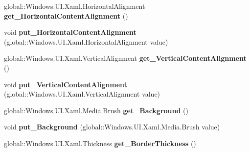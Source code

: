 \begin{DoxyCompactItemize}
global\+::\+Windows.\+U\+I.\+Xaml.\+Horizontal\+Alignment {\bfseries get\+\_\+\+Horizontal\+Content\+Alignment} ()
\item 
\mbox{\label{interface_windows_1_1_u_i_1_1_xaml_1_1_controls_1_1_i_control_aa4cc459384bbe6c700e3a0f0b23f633e}} 
void {\bfseries put\+\_\+\+Horizontal\+Content\+Alignment} (global\+::\+Windows.\+U\+I.\+Xaml.\+Horizontal\+Alignment value)
\item 
\mbox{\label{interface_windows_1_1_u_i_1_1_xaml_1_1_controls_1_1_i_control_ae586ce721d361940da51fcefd32816c7}} 
global\+::\+Windows.\+U\+I.\+Xaml.\+Vertical\+Alignment {\bfseries get\+\_\+\+Vertical\+Content\+Alignment} ()
\item 
\mbox{\label{interface_windows_1_1_u_i_1_1_xaml_1_1_controls_1_1_i_control_a44b19573be16bc17ab68814c38bc6981}} 
void {\bfseries put\+\_\+\+Vertical\+Content\+Alignment} (global\+::\+Windows.\+U\+I.\+Xaml.\+Vertical\+Alignment value)
\item 
\mbox{\label{interface_windows_1_1_u_i_1_1_xaml_1_1_controls_1_1_i_control_aac29873ebb350b3b04070ed6664351eb}} 
global\+::\+Windows.\+U\+I.\+Xaml.\+Media.\+Brush {\bfseries get\+\_\+\+Background} ()
\item 
\mbox{\label{interface_windows_1_1_u_i_1_1_xaml_1_1_controls_1_1_i_control_a3ff4d65a6273f87cf0e2f0258e70a641}} 
void {\bfseries put\+\_\+\+Background} (global\+::\+Windows.\+U\+I.\+Xaml.\+Media.\+Brush value)
\item 
\mbox{\label{interface_windows_1_1_u_i_1_1_xaml_1_1_controls_1_1_i_control_a368b66c8a1f1040880bdefc07e7cb85b}} 
global\+::\+Windows.\+U\+I.\+Xaml.\+Thickness {\bfseries get\+\_\+\+Border\+Thickness} ()
\item 
\mbox{\label{interface_windows_1_1_u_i_1_1_xaml_1_1_controls_1_1_i_control_ab6fd6e86f54e793f12961312b55b372f}} 

\end{DoxyCompactItemize}
